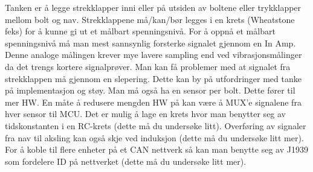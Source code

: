 Tanken er å legge strekklapper inni eller på utsiden av boltene eller
trykklapper mellom bolt og nav. Strekklappene
må/kan/bør legges i en krets (Wheatstone feks) for å kunne gi ut et målbart
spenningsnivå. For å oppnå et målbart spenningsnivå må man mest sannsynlig
forsterke signalet gjennom en In Amp. Denne analoge målingen krever mye lavere sampling end ved
vibrasjonsmålinger da det trengs kortere signalprøver.
Man kan få problemer med at signalet fra strekklappen må gjennom en slepering.
Dette kan by på utfordringer med tanke på implementasjon og støy.
Man må også ha en sensor per bolt. Dette fører til mer HW. En måte å redusere
mengden HW på kan være å MUX'e signalene fra hver sensor til MCU. Det er mulig å lage
en krets hvor man benytter seg av tidskonstanten i en RC-krets (dette må du
undersøke litt). Overføring av
signaler fra nav til aksling kan også skje ved induksjon (dette må du undersøke
litt mer). For å koble til flere
enheter på et CAN nettverk så kan man benytte seg av J1939 som fordelere ID på
nettverket (dette må du undersøke litt mer). \\
